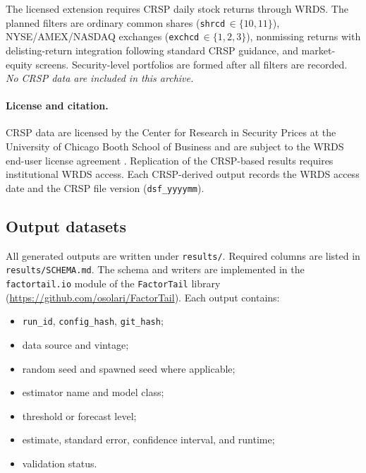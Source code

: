 The licensed extension requires CRSP daily stock returns through WRDS. The
planned filters are ordinary common shares (\texttt{shrcd}\,$\in\{10,11\}$),
NYSE/AMEX/NASDAQ exchanges (\texttt{exchcd}\,$\in\{1,2,3\}$), nonmissing
returns with delisting-return integration following standard CRSP guidance,
and market-equity screens. Security-level portfolios are formed after all
filters are recorded. \emph{No CRSP data are included in this archive.}

\paragraph{License and citation.}
CRSP data are licensed by the Center for Research in Security Prices at the
University of Chicago Booth School of Business and are subject to the WRDS
end-user license agreement \citep{CRSPGuide2026}. Replication of the
CRSP-based results requires institutional WRDS access. Each CRSP-derived
output records the WRDS access date and the CRSP file version
(\texttt{dsf\_yyyymm}).

\subsection{Output datasets}

All generated outputs are written under \texttt{results/}. Required columns
are listed in \texttt{results/SCHEMA.md}. The schema and writers are
implemented in the \texttt{factortail.io} module of the \texttt{FactorTail}
library (\url{https://github.com/osolari/FactorTail}). Each output
contains:
\begin{itemize}
\item \texttt{run\_id}, \texttt{config\_hash}, \texttt{git\_hash};
\item data source and vintage;
\item random seed and spawned seed where applicable;
\item estimator name and model class;
\item threshold or forecast level;
\item estimate, standard error, confidence interval, and runtime;
\item validation status.
\end{itemize}
